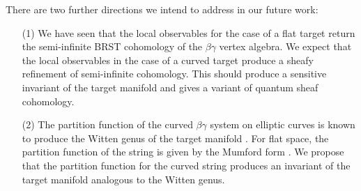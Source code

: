 There are two further directions we intend to address in our future work:
\begin{itemize}
\item[(1)] We have seen that the local observables for the case of a flat target return the semi-infinite BRST cohomology of the $\beta\gamma$ vertex algebra. 
We expect that the local observables in the case of a curved target produce a sheafy refinement of semi-infinite cohomology. 
This should produce a sensitive invariant of the target manifold and gives a variant of quantum sheaf cohomology. 
\item[(2)] The partition function of the curved $\beta\gamma$ system on elliptic curves is known to produce the Witten genus of the target manifold \cite{wg2}. 
For flat space, the partition function of the string is given by the Mumford form \cite{BM}. 
We propose that the partition function for the curved string produces an invariant of the target manifold analogous to the Witten genus. 
\end{itemize}

